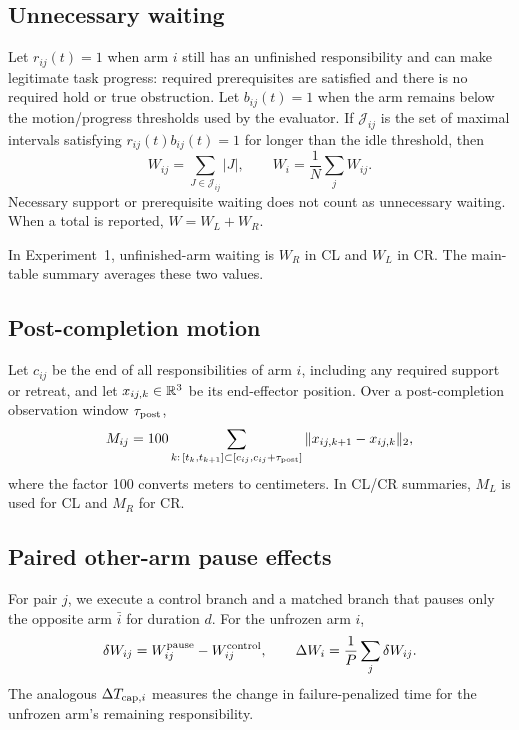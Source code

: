 \subsection{Unnecessary waiting}
Let $r_{ij}(t)=1$ when arm $i$ still has an unfinished responsibility and can make legitimate task progress: required prerequisites are satisfied and there is no required hold or true obstruction. Let $b_{ij}(t)=1$ when the arm remains below the motion/progress thresholds used by the evaluator. If $\mathcal J_{ij}$ is the set of maximal intervals satisfying $r_{ij}(t)b_{ij}(t)=1$ for longer than the idle threshold, then
\begin{equation}
 W_{ij}=\sum_{J\in\mathcal J_{ij}} |J|,
 \qquad
 W_i=\frac{1}{N}\sum_j W_{ij}.
 \label{eq:metrics-wait}
\end{equation}
Necessary support or prerequisite waiting does not count as unnecessary waiting. When a total is reported, $W=W_L+W_R$.

In Experiment~1, unfinished-arm waiting is $W_R$ in CL and $W_L$ in CR. The main-table summary averages these two values.

\subsection{Post-completion motion}
Let $c_{ij}$ be the end of all responsibilities of arm $i$, including any required support or retreat, and let $x_{ij,k}\in\mathbb{R}^3$ be its end-effector position. Over a post-completion observation window $\tau_{\rm post}$,
\begin{equation}
 M_{ij}=100\sum_{k:\,[t_k,t_{k+1}]\subset[c_{ij},c_{ij}+\tau_{\rm post}]}
 \|x_{ij,k+1}-x_{ij,k}\|_2,
 \label{eq:metrics-motion}
\end{equation}
where the factor 100 converts meters to centimeters. In CL/CR summaries, $M_L$ is used for CL and $M_R$ for CR.

\subsection{Paired other-arm pause effects}
For pair $j$, we execute a control branch and a matched branch that pauses only the opposite arm $\bar i$ for duration $d$. For the unfrozen arm $i$,
\begin{equation}
 \delta W_{ij}=W_{ij}^{\rm pause}-W_{ij}^{\rm control},
 \qquad
 \Delta W_i=\frac{1}{P}\sum_j\delta W_{ij}.
 \label{eq:metrics-paired}
\end{equation}
The analogous $\Delta T_{{\rm cap},i}$ measures the change in failure-penalized time for the unfrozen arm's remaining responsibility.

